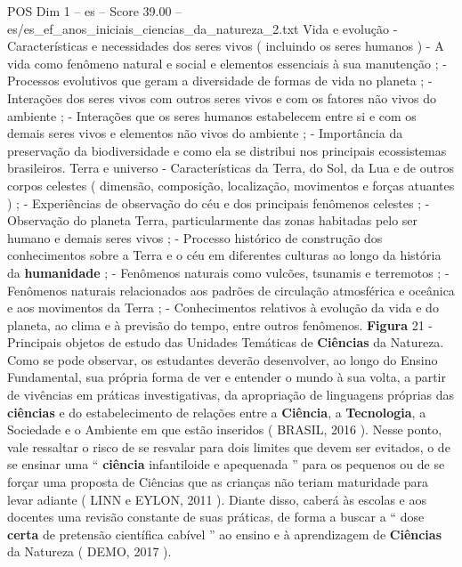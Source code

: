 \begin{textsample}{POS Dim 1 – es – Score 39.00 – es/es\_ef\_anos\_iniciais\_ciencias\_da\_natureza\_2.txt}
Vida e evolução - Características e necessidades dos seres vivos ( incluindo os seres humanos ) - A vida como fenômeno natural e social e elementos essenciais à sua manutenção ; - Processos evolutivos que geram a diversidade de formas de vida no planeta ; - Interações dos seres vivos com outros seres vivos e com os fatores não vivos do ambiente ; - Interações que os seres humanos estabelecem entre si e com os demais seres vivos e elementos não vivos do ambiente ; - Importância da preservação da biodiversidade e como ela se distribui nos principais ecossistemas brasileiros.
Terra e universo - Características da Terra, do Sol, da Lua e de outros corpos celestes ( dimensão, composição, localização, movimentos e forças atuantes ) ; - Experiências de observação do céu e dos principais fenômenos celestes ; - Observação do planeta Terra, particularmente das zonas habitadas pelo ser humano e demais seres vivos ; - Processo histórico de construção dos conhecimentos sobre a Terra e o céu em diferentes culturas ao longo da história da \textbf{humanidade} ; - Fenômenos naturais como vulcões, tsunamis e terremotos ; - Fenômenos naturais relacionados aos padrões de circulação atmosférica e oceânica e aos movimentos da Terra ; - Conhecimentos relativos à evolução da vida e do planeta, ao clima e à previsão do tempo, entre outros fenômenos. \textbf{Figura} 21 - Principais objetos de estudo das Unidades Temáticas de \textbf{Ciências} da Natureza.
Como se pode observar, os estudantes deverão desenvolver, ao longo do Ensino Fundamental, sua própria forma de ver e entender o mundo à sua volta, a partir de vivências em práticas investigativas, da apropriação de linguagens próprias das \textbf{ciências} e do estabelecimento de relações entre a \textbf{Ciência}, a \textbf{Tecnologia}, a Sociedade e o Ambiente em que estão inseridos ( BRASIL, 2016 ).
Nesse ponto, vale ressaltar o risco de se resvalar para dois limites que devem ser evitados, o de se ensinar uma “ \textbf{ciência} infantiloide e apequenada ” para os pequenos ou de se forçar uma proposta de Ciências que as crianças não teriam maturidade para levar adiante ( LINN e EYLON, 2011 ).
Diante disso, caberá às escolas e aos docentes uma revisão constante de suas práticas, de forma a buscar a “ dose \textbf{certa} de pretensão científica cabível ” ao ensino e à aprendizagem de \textbf{Ciências} da Natureza ( DEMO, 2017 ).

\end{textsample}
